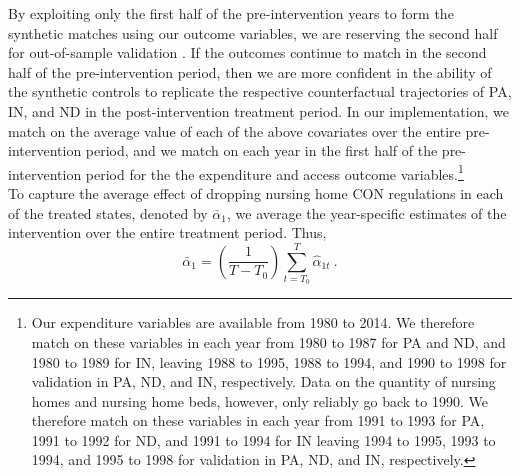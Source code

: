 \documentclass[../Main.tex]{subfiles}
\begin{document}
\indent By exploiting only the first half of the pre-intervention years to form the synthetic matches using our outcome variables, we are reserving the second half for out-of-sample validation \citep{cavallo2013catastrophic}. If the outcomes continue to match in the second half of the pre-intervention period, then we are more confident in the ability of the synthetic controls to replicate the respective counterfactual trajectories of PA, IN, and ND in the post-intervention treatment period. In our implementation, we match on the average value of each of the above covariates over the entire pre-intervention period, and we match on each year in the first half of the pre-intervention period for the the expenditure and access outcome variables.\footnote{Our expenditure variables are available from 1980 to 2014. We therefore match on these variables in each year from 1980 to 1987 for PA and ND, and 1980 to 1989 for IN, leaving 1988 to 1995, 1988 to 1994, and 1990 to 1998 for validation in PA, ND, and IN, respectively. Data on the quantity of nursing homes and nursing home beds, however, only reliably go back to 1990. We therefore match on these variables in each year from 1991 to 1993 for PA, 1991 to 1992 for ND, and 1991 to 1994 for IN leaving 1994 to 1995, 1993 to 1994, and 1995 to 1998 for validation in PA, ND, and IN, respectively.}\\
\indent To capture the average effect of dropping nursing home CON regulations in each of the treated states, denoted by $\bar{\alpha}_1$, we average the year-specific estimates of the intervention over the entire treatment period. Thus,
\begin{equation} \label{eq:ave_effect}
    \bar{\alpha}_1=\left(\frac{1}{T-T_0}\right)\sum_{t=T_0}^{T}\hat{\alpha}_{1t} ~ .
\end{equation}
\end{document}

